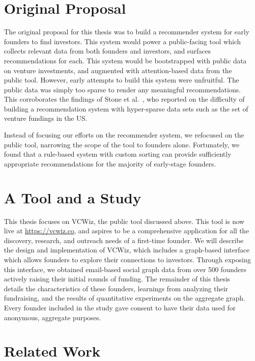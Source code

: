 \section{Original Proposal}

The original proposal for this thesis was to build a recommender system for early founders to find investors. This system would power a public-facing tool which collects relevant data from both founders and investors, and surfaces recommendations for each. This system would be bootstrapped with public data on venture investments, and augmented with attention-based data from the public tool. However, early attempts to build this system were unfruitful. The public data was simply too sparse to render any meaningful recommendations. This corroborates the findings of Stone et al.~\cite{Stone:2013:EST:2541167.2507882}, who reported on the difficulty of building a recommendation system with hyper-sparse data sets such as the set of venture fundings in the US.

Instead of focusing our efforts on the recommender system, we refocused on the public tool, narrowing the scope of the tool to founders alone. Fortunately, we found that a rule-based system with custom sorting can provide sufficiently appropriate recommendations for the majority of early-stage founders.

\section{A Tool and a Study}

This thesis focuses on VCWiz, the public tool discussed above. This tool is now live at \url{https://vcwiz.co}, and aspires to be a comprehensive application for all the discovery, research, and outreach needs of a first-time founder. We will describe the design and implementation of VCWiz, which includes a graph-based interface which allows founders to explore their connections to investors. Through exposing this interface, we obtained email-based social graph data from over 500 founders actively raising their initial rounds of funding. The remainder of this thesis details the characteristics of these founders, learnings from analyzing their fundraising, and the results of quantitative experiments on the aggregate graph. Every founder included in the study gave consent to have their data used for anonymous, aggregate purposes.

\section{Related Work}

